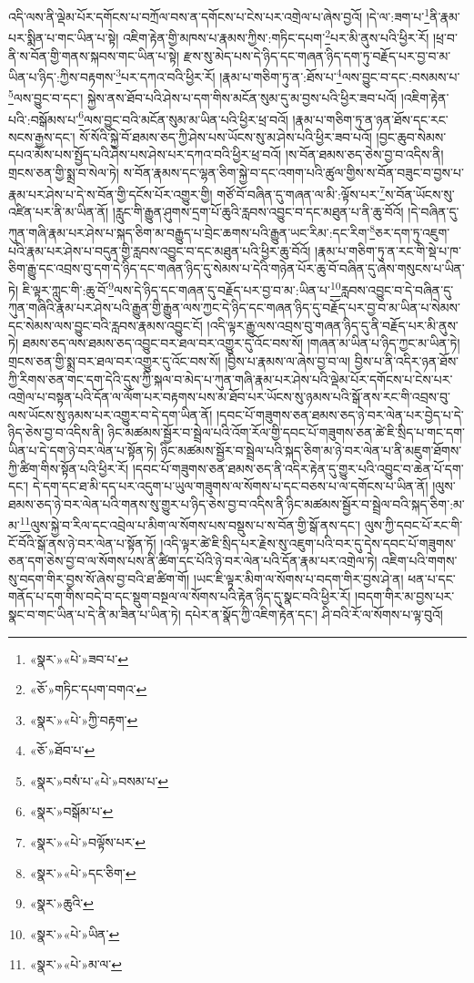 འདི་ལས་ནི་ལྡེམ་པོར་དགོངས་པ་བཀྲོལ་བས་ན་དགོངས་པ་ངེས་པར་འགྲེལ་པ་ཞེས་བྱའོ། །དེ་ལ་:ཟག་པ་\footnote{«སྣར་»«པེ་»ཟབ་པ་}ནི་རྣམ་པར་སྨིན་པ་གང་ཡིན་པ་སྟེ། འཇིག་རྟེན་གྱི་མཁས་པ་རྣམས་ཀྱིས་:གཏིང་དཔག་\footnote{«ཅོ་»གཏིང་དཔག་བགའ་}པར་མི་ནུས་པའི་ཕྱིར་རོ། །ཕྲ་བ་ནི་ས་བོན་གྱི་གནས་སྐབས་གང་ཡིན་པ་སྟེ། རྫས་སུ་མེད་པས་དེ་ཉིད་དང་གཞན་ཉིད་དག་ཏུ་བརྗོད་པར་བྱ་བ་མ་ཡིན་པ་ཉིད་:ཀྱིས་བརྟགས་\footnote{«སྣར་»«པེ་»ཀྱི་བརྟག་}པར་དཀའ་བའི་ཕྱིར་རོ། །རྣམ་པ་གཅིག་ཏུ་ན་:ཐོས་པ་\footnote{«ཅོ་»ཐོབ་པ་}ལས་བྱུང་བ་དང་:བསམས་པ་\footnote{«སྣར་»བསཾ་པ་«པེ་»བསམ་པ་}ལས་བྱུང་བ་དང་། སྐྱེས་ནས་ཐོབ་པའི་ཤེས་པ་དག་གིས་མངོན་སུམ་དུ་མ་བྱས་པའི་ཕྱིར་ཟབ་པའོ། །འཇིག་རྟེན་པའི་:བསྒོམས་པ་\footnote{«སྣར་»བསྒོམ་པ་}ལས་བྱུང་བའི་མངོན་སུམ་མ་ཡིན་པའི་ཕྱིར་ཕྲ་བའོ། །རྣམ་པ་གཅིག་ཏུ་ན་ཉན་ཐོས་དང་རང་སངས་རྒྱས་དང་། སོ་སོའི་སྐྱེ་བོ་ཐམས་ཅད་ཀྱི་ཤེས་པས་ཡོངས་སུ་མ་ཤེས་པའི་ཕྱིར་ཟབ་པའོ། །བྱང་ཆུབ་སེམས་དཔའ་མོས་པས་སྤྱོད་པའི་ཤེས་པས་ཤེས་པར་དཀའ་བའི་ཕྱིར་ཕྲ་བའོ། །ས་བོན་ཐམས་ཅད་ཅེས་བྱ་བ་འདིས་ནི། གྲངས་ཅན་གྱི་སྨྲ་བ་སེལ་ཏེ། ས་བོན་རྣམས་དང་ལྷན་ཅིག་སྐྱེ་བ་དང་འགག་པའི་ཚུལ་གྱིས་ས་བོན་བཟུང་བ་བྱས་པ་རྣམ་པར་ཤེས་པ་དེ་ས་བོན་གྱི་དངོས་པོར་འགྱུར་གྱི། གཙོ་བོ་བཞིན་དུ་གཞན་ལ་མི་:ལྟོས་པར་\footnote{«སྣར་»«པེ་»བལྟོས་པར་}ས་བོན་ཡོངས་སུ་འཛིན་པར་ནི་མ་ཡིན་ནོ། །རླུང་གི་རྒྱུན་ཤུགས་དྲག་པོ་ཆུའི་རླབས་འབྱུང་བ་དང་མཐུན་པ་ནི་ཆུ་བོའོ། །དེ་བཞིན་དུ་ཀུན་གཞི་རྣམ་པར་ཤེས་པ་སྐད་ཅིག་མ་བརྒྱུད་པ་བྲེང་ཆགས་པའི་རྒྱུན་ཡང་རིམ་:དང་རིག་\footnote{«སྣར་»«པེ་»དང་ཅིག་}ཅར་དག་ཏུ་འཇུག་པའི་རྣམ་པར་ཤེས་པ་བདུན་གྱི་རླབས་འབྱུང་བ་དང་མཐུན་པའི་ཕྱིར་ཆུ་བོའོ། །རྣམ་པ་གཅིག་ཏུ་ན་རང་གི་སྡེ་པ་ཁ་ཅིག་རྒྱུ་དང་འབྲས་བུ་དག་དེ་ཉིད་དང་གཞན་ཉིད་དུ་སེམས་པ་དེའི་གཉེན་པོར་ཆུ་བོ་བཞིན་དུ་ཞེས་གསུངས་པ་ཡིན་ཏེ། ཇི་ལྟར་ཀླུང་གི་:ཆུ་བོ་\footnote{«སྣར་»ཆུའི་}ལས་དེ་ཉིད་དང་གཞན་དུ་བརྗོད་པར་བྱ་བ་མ་:ཡིན་པ་\footnote{«སྣར་»«པེ་»ཡིན་}རླབས་འབྱུང་བ་དེ་བཞིན་དུ་ཀུན་གཞིའི་རྣམ་པར་ཤེས་པའི་རྒྱུན་གྱི་རྒྱུན་ལས་ཀྱང་དེ་ཉིད་དང་གཞན་ཉིད་དུ་བརྗོད་པར་བྱ་བ་མ་ཡིན་པ་སེམས་དང་སེམས་ལས་བྱུང་བའི་རླབས་རྣམས་འབྱུང་ངོ། །འདི་ལྟར་རྒྱུ་ལས་འབྲས་བུ་གཞན་ཉིད་དུ་ནི་བརྗོད་པར་མི་ནུས་ཏེ། ཐམས་ཅད་ལས་ཐམས་ཅད་འབྱུང་བར་ཐལ་བར་འགྱུར་དུ་འོང་བས་སོ། །གཞན་མ་ཡིན་པ་ཉིད་ཀྱང་མ་ཡིན་ཏེ། གྲངས་ཅན་གྱི་སྨྲ་བར་ཐལ་བར་འགྱུར་དུ་འོང་བས་སོ། །བྱིས་པ་རྣམས་ལ་ཞེས་བྱ་བ་ལ། བྱིས་པ་ནི་འདིར་ཉན་ཐོས་ཀྱི་རིགས་ཅན་གང་དག་དེའི་དུས་ཀྱི་སྐལ་བ་མེད་པ་ཀུན་གཞི་རྣམ་པར་ཤེས་པའི་ལྡེམ་པོར་དགོངས་པ་ངེས་པར་འགྲེལ་པ་བསྟན་པའི་དོན་ལ་ལོག་པར་བརྟགས་པས་མ་ཐོབ་པར་ཡོངས་སུ་ཉམས་པའི་སྒོ་ནས་རང་གི་འབྲས་བུ་ལས་ཡོངས་སུ་ཉམས་པར་འགྱུར་བ་དེ་དག་ཡིན་ནོ། །དབང་པོ་གཟུགས་ཅན་ཐམས་ཅད་ཉེ་བར་ལེན་པར་བྱེད་པ་དེ་ཉིད་ཅེས་བྱ་བ་འདིས་ནི། ཉིང་མཚམས་སྦྱོར་བ་སྦྲེལ་པའི་འོག་རོལ་གྱི་དབང་པོ་གཟུགས་ཅན་ཚེ་ཇི་སྲིད་པ་གང་དག་ཡིན་པ་དེ་དག་ཉེ་བར་ལེན་པ་སྟོན་ཏེ། ཉིང་མཚམས་སྦྱོར་བ་སྦྲེལ་པའི་སྐད་ཅིག་མ་ཉེ་བར་ལེན་པ་ནི་མཇུག་ཐོགས་ཀྱི་ཚིག་གིས་སྟོན་པའི་ཕྱིར་རོ། །དབང་པོ་གཟུགས་ཅན་ཐམས་ཅད་ནི་འདིར་རྟེན་དུ་གྱུར་པའི་འབྱུང་བ་ཆེན་པོ་དག་དང་། དེ་དག་དང་ཐ་མི་དད་པར་འདུག་པ་ཡུལ་གཟུགས་ལ་སོགས་པ་དང་བཅས་པ་ལ་དགོངས་པ་ཡིན་ནོ། །ལུས་ཐམས་ཅད་ཉེ་བར་ལེན་པའི་གནས་སུ་གྱུར་པ་ཉིད་ཅེས་བྱ་བ་འདིས་ནི་ཉིང་མཚམས་སྦྱོར་བ་སྦྲེལ་བའི་སྐད་ཅིག་:མ་མ་\footnote{«སྣར་»«པེ་»མ་ལ་}ལུས་སྐྱེ་བ་རིལ་དང་འབྲེལ་པ་མིག་ལ་སོགས་པས་བསྡུས་པ་ས་བོན་གྱི་སྒོ་ནས་དང་། ལུས་ཀྱི་དབང་པོ་རང་གི་ངོ་བོའི་སྒོ་ནས་ཉེ་བར་ལེན་པ་སྟོན་ཏོ། །འདི་ལྟར་ཚེ་ཇི་སྲིད་པར་རྗེས་སུ་འཇུག་པའི་བར་དུ་དེས་དབང་པོ་གཟུགས་ཅན་དག་ཅེས་བྱ་བ་ལ་སོགས་པས་ནི་ཚིག་དང་པོའི་ཉེ་བར་ལེན་པའི་དོན་རྣམ་པར་འགྲེལ་ཏེ། འཇིག་པའི་གགས་སུ་བདག་གིར་བྱས་སོ་ཞེས་བྱ་བའི་ཐ་ཚིག་གོ། །ཡང་ཇི་ལྟར་མིག་ལ་སོགས་པ་བདག་གིར་བྱས་ཤེ་ན། ཕན་པ་དང་གནོད་པ་དག་གིས་བདེ་བ་དང་སྡུག་བསྔལ་ལ་སོགས་པའི་རྟེན་ཉིད་དུ་སྣང་བའི་ཕྱིར་རོ། །བདག་གིར་མ་བྱས་པར་སྣང་བ་གང་ཡིན་པ་དེ་ནི་མ་ཟིན་པ་ཡིན་ཏེ། དཔེར་ན་སྣོད་ཀྱི་འཇིག་རྟེན་དང་། ཤི་བའི་རོ་ལ་སོགས་པ་ལྟ་བུའོ། 